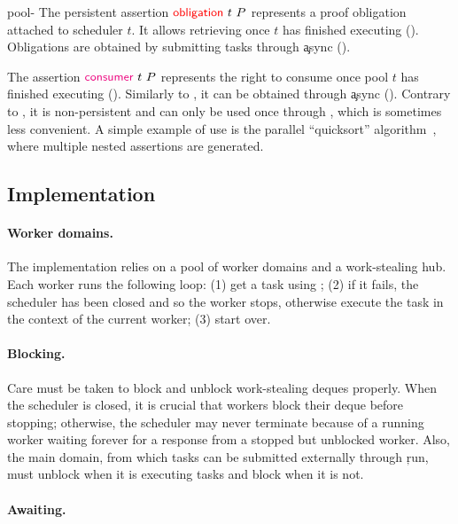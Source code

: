 \begin{tirPrefix}{pool-}
The persistent assertion $\obligation\ t\ \iProp$ represents a proof obligation attached to scheduler $t$.
It allows retrieving \iProp once $t$ has finished executing ().
Obligations are obtained by submitting tasks through \c{async} ().

The assertion $\consumer\ t\ \iProp$ represents the right to consume \iProp once pool $t$ has finished executing ().
Similarly to \obligation, it can be obtained through \c{async} ().
Contrary to \obligation, it is non-persistent and can only be used once through , which is sometimes less convenient.
A simple example of use is the parallel ``quicksort'' algorithm~, where multiple nested \consumer assertions are generated.

\end{tirPrefix}

\subsection{Implementation}
\label{sec:parabs_pool_impl}

\paragraph{Worker domains.}

The implementation relies on a pool of worker domains and a work-stealing hub.
Each worker runs the following loop:
(1) get a task using ;
(2) if it fails, the scheduler has been closed and so the worker stops, otherwise execute the task in the context of the current worker;
(3) start over.

\paragraph{Blocking.}

Care must be taken to block and unblock work-stealing deques properly.
When the scheduler is closed, it is crucial that workers block their deque before stopping; otherwise, the scheduler may never terminate because of a running worker waiting forever for a response from a stopped but unblocked worker.
Also, the main domain, from which tasks can be submitted externally through \c{run}, must unblock when it is executing tasks and block when it is not.

\paragraph{Awaiting.}

